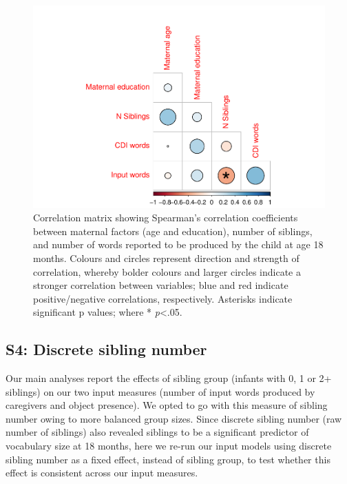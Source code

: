 \documentclass[
  man,mask,floatsintext]{apa6}
\begin{document}
\begin{figure}
\centering
\includegraphics{SiblingsStudy_SupplementaryData-anon_files/figure-latex/Figure-correlations-1.pdf}
\caption{\label{fig:Figure-correlations}Correlation matrix showing Spearman's correlation coefficients between maternal factors (age and education), number of siblings, and number of words reported to be produced by the child at age 18 months. Colours and circles represent direction and strength of correlation, whereby bolder colours and larger circles indicate a stronger correlation between variables; blue and red indicate positive/negative correlations, respectively. Asterisks indicate significant p values; where * \emph{p}\textless.05.}
\end{figure}

\newpage

\hypertarget{s4-discrete-sibling-number}{%
\subsection{S4: Discrete sibling number}\label{s4-discrete-sibling-number}}

Our main analyses report the effects of sibling group (infants with 0, 1 or 2+ siblings) on our two input measures (number of input words produced by caregivers and object presence). We opted to go with this measure of sibling number owing to more balanced group sizes. Since discrete sibling number (raw number of siblings) also revealed siblings to be a significant predictor of vocabulary size at 18 months, here we re-run our input models using discrete sibling number as a fixed effect, instead of sibling group, to test whether this effect is consistent across our input measures.
\end{document}
